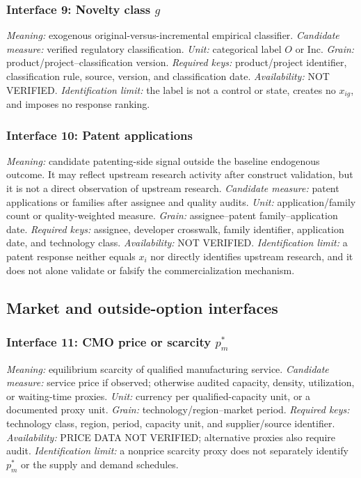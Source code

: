 \subsubsection{Interface 9: Novelty class \texorpdfstring{\(g\)}{novelty class}}
\textit{Meaning:} exogenous original-versus-incremental empirical classifier.
\textit{Candidate measure:} verified regulatory classification.
\textit{Unit:} categorical label \(O\) or \(\mathrm{Inc}\).
\textit{Grain:} product/project--classification version.
\textit{Required keys:} product/project identifier, classification rule,
source, version, and classification date.
\textit{Availability:} NOT VERIFIED.
\textit{Identification limit:} the label is not a control or state, creates no
\(x_{ig}\), and imposes no response ranking.

\subsubsection{Interface 10: Patent applications}
\textit{Meaning:} candidate patenting-side signal outside the baseline
endogenous outcome. It may reflect upstream research activity after construct
validation, but it is not a direct observation of upstream research.
\textit{Candidate measure:} patent applications or families after assignee
and quality audits.
\textit{Unit:} application/family count or quality-weighted measure.
\textit{Grain:} assignee--patent family--application date.
\textit{Required keys:} assignee, developer crosswalk, family identifier,
application date, and technology class.
\textit{Availability:} NOT VERIFIED.
\textit{Identification limit:} a patent response neither equals \(x_i\) nor
directly identifies upstream research, and it does not alone validate or
falsify the commercialization mechanism.

\subsection{Market and outside-option interfaces}
\label{subsec:p10-market-outside}

\subsubsection{Interface 11: CMO price or scarcity \texorpdfstring{\(p_m^*\)}{equilibrium CMO price}}
\textit{Meaning:} equilibrium scarcity of qualified manufacturing service.
\textit{Candidate measure:} service price if observed; otherwise audited
capacity, density, utilization, or waiting-time proxies.
\textit{Unit:} currency per qualified-capacity unit, or a documented proxy
unit.
\textit{Grain:} technology/region--market period.
\textit{Required keys:} technology class, region, period, capacity unit, and
supplier/source identifier.
\textit{Availability:} PRICE DATA NOT VERIFIED; alternative proxies also
require audit.
\textit{Identification limit:} a nonprice scarcity proxy does not separately
identify \(p_m^*\) or the supply and demand schedules.

